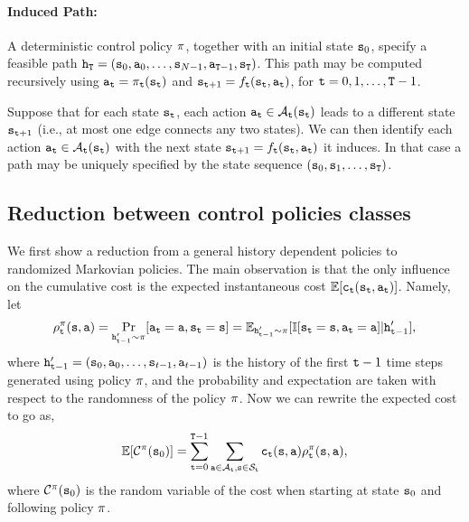 \paragraph{Induced Path:}
A deterministic control policy $\pi $, together with an initial state
${{\tt s}_0}$, specify a feasible path ${{\tt h}_{\tt T}} =
({{\tt s}_0},{{\tt a}_0}, \ldots ,{{\tt s}_{N -
1}},{{\tt a}_{{\tt T} - 1}},{{\tt s}_{\tt T}})$. This path may be
computed recursively using ${{\tt a}_{{\tt t}}} = {\pi
_{{\tt t}}}({{\tt s}_{{\tt t}}})$ and ${{\tt s}_{{\tt t} + 1}} =
{f_{{\tt t}}}({{\tt s}_{{\tt t}}},{{\tt a}_{{\tt t}}})$, for ${\tt t} =
0,1, \ldots ,{\tt T} - 1$.

\begin{remark}
Suppose that for each state ${{\tt s}_{{\tt t}}}$, each action
${{\tt a}_{{\tt t}}} \in {\mathcal{A}_{{\tt t}}}({{\tt s}_{{\tt t}}})$
leads to a different state ${{\tt s}_{{\tt t} + 1}}$ (i.e., at most
one edge connects any two states). We can then identify each action
${{\tt a}_{{\tt t}}} \in {\mathcal{A}_{{\tt t}}}({\tt s}_{{\tt t}})$ with
the next state ${{\tt s}_{{\tt t} + 1}} =
{f_{{\tt t}}}({\tt s}_{{\tt t}},{{\tt a}_{{\tt t}}})$ it induces. In
that case a path may be uniquely specified by the state sequence
$({{\tt s}_0},{{\tt s}_1}, \ldots ,{{\tt s}_{\tt T}})$.
\end{remark}


\subsection{Reduction between control policies classes}\label{chp2:sec:FH-HS-MD}

We first show a reduction from a general history dependent policies
to randomized Markovian policies. The main observation is that the
only influence on the cumulative cost is the expected instantaneous
cost $\mathbb{E}[{\tt c}_{\tt t}({\tt s}_{\tt t},{\tt a}_{\tt t})]$. Namely, let
\[
\rho^\pi_{\tt t}({\tt s},{\tt a})=\Pr_{{\tt h}'_{{\tt t}-1}\sim \pi}
[{\tt a}_{\tt t}={\tt a},{\tt s}_{\tt t}={\tt s}]=\mathbb{E}_{{\tt h}'_{{\tt t}-1}\sim \pi}[\mathbb{I}
[{\tt s}_{\tt t}={\tt s},{\tt a}_{\tt t}={\tt a}]| {\tt h}'_{{\tt t}-1}],
\]
where
${\tt h}'_{{\tt t}-1}=({\tt s}_0,{\tt a}_0,\ldots,{\tt s}_{t-1},{\tt a}_{t-1})$
is the history of the first ${\tt t}-1$ time steps generated using policy
$\pi$, and the probability and expectation are taken with
respect to the randomness of the policy $\pi$. Now we can
rewrite the expected cost to go as,
\[
\mathbb{E}[\mathcal{C}^\pi({\tt s}_0)]=\sum_{{\tt t}=0}^{{\tt T}-1}
\sum_{{\tt a}\in \mathcal{A}_{\tt t},{\tt s}\in \mathcal{S}_{\tt t}}
{\tt c}_{\tt t}({\tt s},{\tt a})\rho^\pi_{\tt t}({\tt s},{\tt a}),
\]
where $\mathcal{C}^\pi({\tt s}_0)$ is the random variable of the cost
when starting at state ${\tt s}_0$ and following policy $\pi$.


